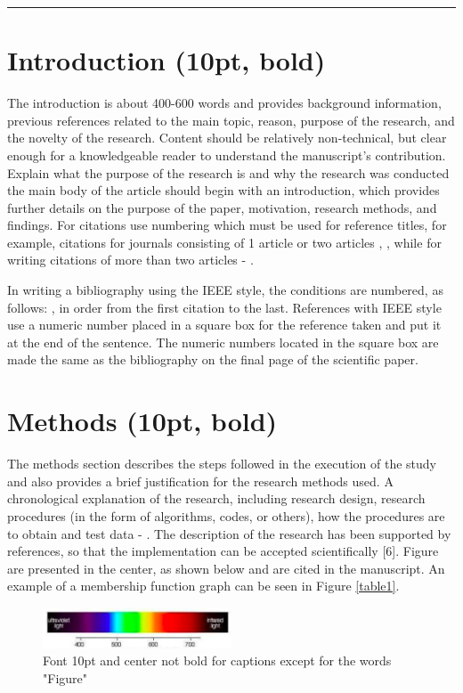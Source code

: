 \documentclass{article}
\begin{document}
\noindent\rule{15cm}{0.4pt}

\section{Introduction (10pt, bold)}
The introduction is about 400-600 words and provides background information, previous references related to the main topic, reason, purpose of the research, and the novelty of the research.  Content should be relatively non-technical, but clear enough for a knowledgeable reader to understand the manuscript’s contribution. Explain what the purpose of the research is and why the research was conducted the main body of the article should begin with an introduction, which provides further details on the purpose of the paper, motivation, research methods, and findings. For citations use numbering which must be used for reference titles, for example, citations for journals consisting of 1 article  \cite{Septiawan1} or two articles \cite{Septiawan2}, \cite{Lucy}, while for writing citations of more than two articles \cite{Gingold} - \cite{Morikawa}.

In writing a bibliography using the IEEE style, the conditions are numbered, as follows: \cite{Septiawan1}, in order from the first citation to the last. References with IEEE style use a numeric number placed in a square box for the reference taken and put it at the end of the sentence. The numeric numbers located in the square box are made the same as the bibliography on the final page of the scientific paper.

\section{Methods (10pt, bold)}
The methods section describes the steps followed in the execution of the study and also provides a brief justification for the research methods used. A chronological explanation of the research, including research design, research procedures (in the form of algorithms, codes, or others), how the procedures are to obtain and test data \cite{Lo} - \cite{Hang}. The description of the research has been supported by references, so that the implementation can be accepted scientifically [6]. Figure are presented in the center, as shown below and are cited in the manuscript. An example of a membership function graph can be seen in Figure \ref{table1}.

\begin{figure}[h]
	\centering
	\includegraphics[width=0.5\textwidth]{images/figur1.PNG}
	\caption{Font 10pt and center not bold for captions except for the words "Figure"}
	\label{fig1}
\end{figure}
\end{document}
